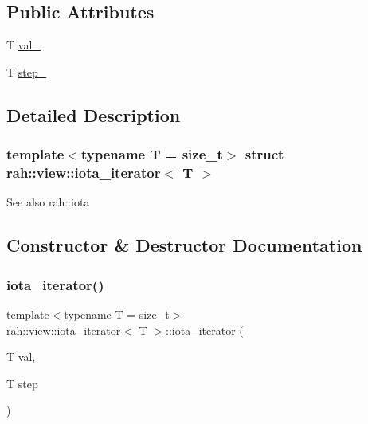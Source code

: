 \subsection*{Public Attributes}
\begin{DoxyCompactItemize}
\item 
T \mbox{\hyperlink{structrah_1_1view_1_1iota__iterator_a7a2ef77dc1a09b2eea42804c2297d057}{val\+\_\+}}
\item 
T \mbox{\hyperlink{structrah_1_1view_1_1iota__iterator_ac30abc689d8d82810bf78ceec3893bd2}{step\+\_\+}}
\end{DoxyCompactItemize}


\subsection{Detailed Description}
\subsubsection*{template$<$typename T = size\+\_\+t$>$\newline
struct rah\+::view\+::iota\+\_\+iterator$<$ T $>$}

\begin{DoxySeeAlso}{See also}
rah\+::iota 
\end{DoxySeeAlso}


\subsection{Constructor \& Destructor Documentation}
\mbox{\label{structrah_1_1view_1_1iota__iterator_a7807733a9a9609f8b9652e270551dc9b}} 
\subsubsection{\texorpdfstring{iota\_iterator()}{iota\_iterator()}\hspace{0.1cm}{\footnotesize\ttfamily [1/2]}}
{\footnotesize\ttfamily template$<$typename T  = size\+\_\+t$>$ \\
\mbox{\hyperlink{structrah_1_1view_1_1iota__iterator}{rah\+::view\+::iota\+\_\+iterator}}$<$ T $>$\+::\mbox{\hyperlink{structrah_1_1view_1_1iota__iterator}{iota\+\_\+iterator}} (\begin{DoxyParamCaption}\item[{T}]{val,  }\item[{T}]{step }\end{DoxyParamCaption})\hspace{0.3cm}{\ttfamily [inline]}}

